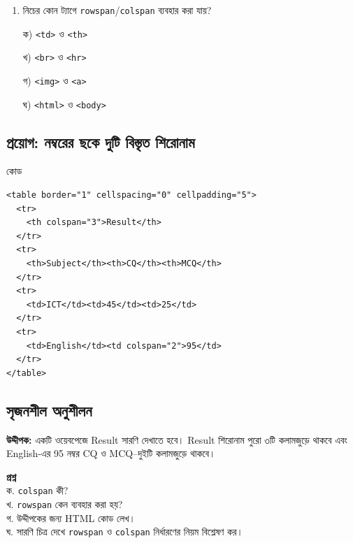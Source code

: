 \par
\par\addvspace{4pt}\noindent
\begin{minipage}[t]{.48\linewidth}\vspace{0pt}
\begin{enumerate}[start=5,leftmargin=*,topsep=0pt,itemsep=0pt]
\item নিচের কোন ট্যাগে \texttt{rowspan}/\texttt{colspan} ব্যবহার করা যায়?
\par ক) \texttt{<td>} ও \texttt{<th>}
\par খ) \texttt{<br>} ও \texttt{<hr>}
\par গ) \texttt{<img>} ও \texttt{<a>}
\par ঘ) \texttt{<html>} ও \texttt{<body>}
\end{enumerate}
\end{minipage}
\par


\subsection{প্রয়োগ: নম্বরের ছকে দুটি বিস্তৃত শিরোনাম}


\begin{examplebox}{কোড}
\begin{verbatim}
<table border="1" cellspacing="0" cellpadding="5">
  <tr>
    <th colspan="3">Result</th>
  </tr>
  <tr>
    <th>Subject</th><th>CQ</th><th>MCQ</th>
  </tr>
  <tr>
    <td>ICT</td><td>45</td><td>25</td>
  </tr>
  <tr>
    <td>English</td><td colspan="2">95</td>
  </tr>
</table>
\end{verbatim}
\end{examplebox}


\subsection{সৃজনশীল অনুশীলন}

\begin{practicebox}
\textbf{উদ্দীপক:} একটি ওয়েবপেজে Result সারণি দেখাতে হবে। Result শিরোনাম পুরো ৩টি কলামজুড়ে থাকবে এবং English-এর 95 নম্বর CQ ও MCQ--দুইটি কলামজুড়ে থাকবে।

\textbf{প্রশ্ন}\\
ক. \texttt{colspan} কী?\\
খ. \texttt{rowspan} কেন ব্যবহার করা হয়?\\
গ. উদ্দীপকের জন্য HTML কোড লেখ।\\
ঘ. সারণি চিত্র দেখে \texttt{rowspan} ও \texttt{colspan} নির্ধারণের নিয়ম বিশ্লেষণ কর।
\end{practicebox}

